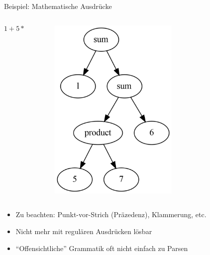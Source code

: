 \documentclass{beamer}
\begin{document}
\begin{frame}{Beispiel: Mathematische Ausdrücke}
	\begin{columns}
		\begin{column}{0.5\textwidth}
			\begin{equation*}
				1 + 5 * 7 + 6
			\end{equation*}
		\end{column}
		\begin{column}{0.5\textwidth}
			\begin{figure}
				\includegraphics[width=0.65\textwidth]{images/baumstruktur.png}
			\end{figure}
		\end{column}
	\end{columns}

	\begin{itemize}
		\item Zu beachten: Punkt-vor-Strich (Präzedenz), Klammerung, etc.
		\item Nicht mehr mit regulären Ausdrücken lösbar
		\item \enquote{Offensichtliche} Grammatik oft nicht einfach zu Parsen
	\end{itemize}
\end{frame}
\end{document}
